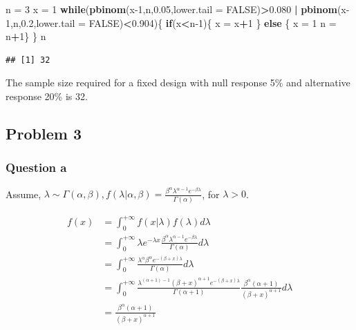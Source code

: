 \documentclass[]{article}
\newenvironment{Shaded}{\begin{snugshade}}{\end{snugshade}}
\newcommand{\ControlFlowTok}[1]{\textcolor[rgb]{0.13,0.29,0.53}{\textbf{#1}}}
\newcommand{\DataTypeTok}[1]{\textcolor[rgb]{0.13,0.29,0.53}{#1}}
\newcommand{\DecValTok}[1]{\textcolor[rgb]{0.00,0.00,0.81}{#1}}
\newcommand{\FloatTok}[1]{\textcolor[rgb]{0.00,0.00,0.81}{#1}}
\newcommand{\KeywordTok}[1]{\textcolor[rgb]{0.13,0.29,0.53}{\textbf{#1}}}
\newcommand{\NormalTok}[1]{#1}
\newcommand{\OperatorTok}[1]{\textcolor[rgb]{0.81,0.36,0.00}{\textbf{#1}}}
\newcommand{\OtherTok}[1]{\textcolor[rgb]{0.56,0.35,0.01}{#1}}
\newcommand{\StringTok}[1]{\textcolor[rgb]{0.31,0.60,0.02}{#1}}
\begin{document}
\begin{Shaded}
\begin{Highlighting}[]
\NormalTok{n =}\StringTok{ }\DecValTok{3}
\NormalTok{x =}\StringTok{ }\DecValTok{1}
\ControlFlowTok{while}\NormalTok{(}\KeywordTok{pbinom}\NormalTok{(x}\DecValTok{-1}\NormalTok{,n,}\FloatTok{0.05}\NormalTok{,}\DataTypeTok{lower.tail =} \OtherTok{FALSE}\NormalTok{)}\OperatorTok{>}\FloatTok{0.080} \OperatorTok{|}\StringTok{ }\KeywordTok{pbinom}\NormalTok{(x}\DecValTok{-1}\NormalTok{,n,}\FloatTok{0.2}\NormalTok{,}\DataTypeTok{lower.tail =} \OtherTok{FALSE}\NormalTok{)}\OperatorTok{<}\FloatTok{0.904}\NormalTok{)\{}
  \ControlFlowTok{if}\NormalTok{(x}\OperatorTok{<}\NormalTok{n}\DecValTok{-1}\NormalTok{)\{}
\NormalTok{    x =}\StringTok{ }\NormalTok{x}\OperatorTok{+}\DecValTok{1}
\NormalTok{  \} }\ControlFlowTok{else}\NormalTok{ \{}
\NormalTok{    x =}\StringTok{ }\DecValTok{1}
\NormalTok{    n =}\StringTok{ }\NormalTok{n}\OperatorTok{+}\DecValTok{1}\NormalTok{\}}
\NormalTok{\}}
\NormalTok{n}
\end{Highlighting}
\end{Shaded}

\begin{verbatim}
## [1] 32
\end{verbatim}

The sample size required for a fixed design with null response 5\% and
alternative response 20\% is 32.

\hypertarget{problem-3}{%
\subsection{Problem 3}\label{problem-3}}

\hypertarget{question-a-2}{%
\subsubsection{Question a}\label{question-a-2}}

Assume,
\(\lambda\sim\Gamma(\alpha,\beta), f(\lambda|\alpha,\beta) = \frac{\beta^{\alpha}\lambda^{\alpha-1}e^{-\beta\lambda}}{\Gamma(\alpha)}\),
for \(\lambda>0\).

\[\begin{split}
f(x)&=\int_0^{+\infty}f(x|\lambda)f(\lambda)d\lambda\\
&=\int_0^{+\infty}\lambda e^{-\lambda x}\frac{\beta^\alpha\lambda^{\alpha-1}e^{-\beta\lambda}}{\Gamma(\alpha)}d\lambda\\
&=\int_0^{+\infty}\frac{\lambda^\alpha\beta^\alpha e^{-(\beta+x)\lambda}}{\Gamma(\alpha)}d\lambda\\
&=\int_0^{+\infty}\frac{\lambda^{(\alpha+1)-1}(\beta+x)^{\alpha+1}e^{-(\beta+x)\lambda}}{\Gamma(\alpha+1)}\frac{\beta^\alpha(\alpha+1)}{(\beta+x)^{\alpha+1}}d\lambda\\
&=\frac{\beta^\alpha(\alpha+1)}{(\beta+x)^{\alpha+1}}
\end{split}\]
\end{document}
